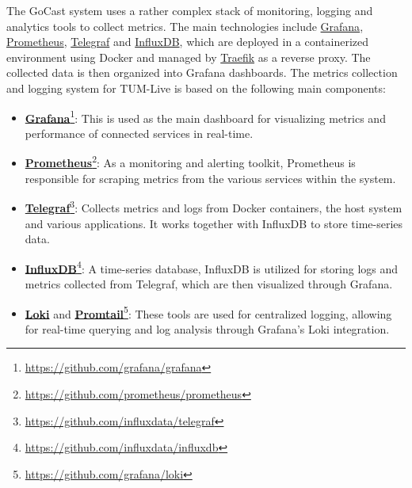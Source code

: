 The GoCast system uses a rather complex stack of monitoring, logging and analytics tools to collect metrics. The main technologies include \href{https://github.com/grafana/grafana}{Grafana}, \href{https://github.com/prometheus/prometheus}{Prometheus}, \href{https://github.com/influxdata/telegraf}{Telegraf} and \href{https://github.com/influxdata/influxdb}{InfluxDB}, which are deployed in a containerized environment using Docker and managed by \href{https://github.com/traefik/traefik}{Traefik} as a reverse proxy. The collected data is then organized into Grafana dashboards. The metrics collection and logging system for TUM-Live is based on the following main components:
\begin{itemize}
    \item \textbf{\href{https://github.com/grafana/grafana}{Grafana}}\footnote{\url{https://github.com/grafana/grafana}}: This is used as the main dashboard for visualizing metrics and performance of connected services in real-time.
    \item \textbf{\href{https://github.com/prometheus/prometheus}{Prometheus}}\footnote{\url{https://github.com/prometheus/prometheus}}: As a monitoring and alerting toolkit, Prometheus is responsible for scraping metrics from the various services within the system.
    \item \textbf{\href{https://github.com/influxdata/telegraf}{Telegraf}}\footnote{\url{https://github.com/influxdata/telegraf}}: Collects metrics and logs from Docker containers, the host system and various applications. It works together with InfluxDB to store time-series data.
    \item \textbf{\href{https://github.com/influxdata/influxdb}{InfluxDB}}\footnote{\url{https://github.com/influxdata/influxdb}}: A time-series database, InfluxDB is utilized for storing logs and metrics collected from Telegraf, which are then visualized through Grafana.
    \item \textbf{\href{https://github.com/grafana/loki}{Loki}} and \textbf{\href{https://grafana.com/docs/loki/latest/send-data/promtail/}{Promtail}}\footnote{\url{https://github.com/grafana/loki}}: These tools are used for centralized logging, allowing for real-time querying and log analysis through Grafana's Loki integration.
\end{itemize}

